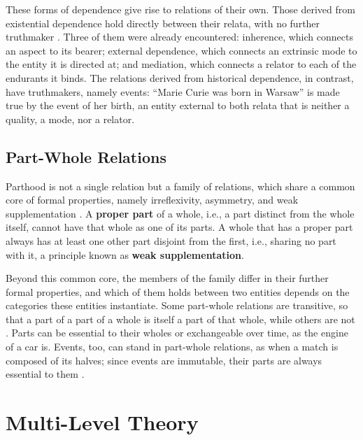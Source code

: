 These forms of dependence give rise to relations of their own. Those derived from existential dependence hold directly between their relata, with no further truthmaker \cite{relations_in_ontology_driven_conceptual_modeling_2019}. Three of them were already encountered: inherence, which connects an aspect to its bearer; external dependence, which connects an extrinsic mode to the entity it is directed at; and mediation, which connects a relator to each of the endurants it binds. The relations derived from historical dependence, in contrast, have truthmakers, namely events: ``Marie Curie was born in Warsaw'' is made true by the event of her birth, an entity external to both relata that is neither a quality, a mode, nor a relator.

\subsection{Part-Whole Relations}
\label{sec:parthood}

Parthood is not a single relation but a family of relations, which share a common core of formal properties, namely irreflexivity, asymmetry, and weak supplementation \cite{ontological_foundations_for_structural_conceptual_models_2005}. A \textbf{proper part} of a whole, i.e., a part distinct from the whole itself, cannot have that whole as one of its parts. A whole that has a proper part always has at least one other part disjoint from the first, i.e., sharing no part with it, a principle known as \textbf{weak supplementation}.

Beyond this common core, the members of the family differ in their further formal properties, and which of them holds between two entities depends on the categories these entities instantiate. Some part-whole relations are transitive, so that a part of a part of a whole is itself a part of that whole, while others are not \cite{guizzardi2009transitivity}. Parts can be essential to their wholes or exchangeable over time, as the engine of a car is. Events, too, can stand in part-whole relations, as when a match is composed of its halves; since events are immutable, their parts are always essential to them \cite{representing_a_reference_foundational_ontology_of_events_in_sroiq_2019}.

\section{Multi-Level Theory}
\label{s:mlt}

